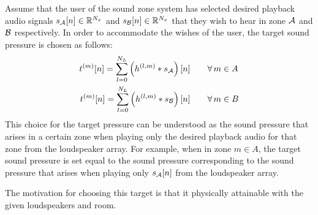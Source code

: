 Assume that the user of the sound zone system has selected desired playback audio signals $s_{\mathcal{A}}[n]\in\mathbb{R}^{N_x}$ and
$s_{\mathcal{B}}[n]\in\mathbb{R}^{N_x}$ that they wish to hear in zone $\mathcal{A}$ and $\mathcal{B}$ respectively.
In order to accommodate the wishes of the user, the target sound pressure is chosen as follows: 
\begin{align}
    t^{(m)}[n] = \sum_{l=0}^{N_L} \left(h^{(l,m)} \ast s_{\mathcal{A}}\right)[n]\qquad &\forall\,m\in A\\
    t^{(m)}[n] = \sum_{l=0}^{N_L} \left(h^{(l,m)} \ast s_{\mathcal{B}}\right)[n]\qquad &\forall\,m\in B
\end{align}
This choice for the target pressure can be understood as the sound pressure that arises in a certain zone
when playing only the desired playback audio for that zone from the loudspeaker array. 
For example, when in zone $m\in A$, the target sound pressure is set equal to the sound pressure corresponding to 
the sound pressure that arises when playing only $s_{\mathcal{A}}[n]$ from the loudspeaker array.

The motivation for choosing this target is that it physically attainable with the given loudspeakers and room.
